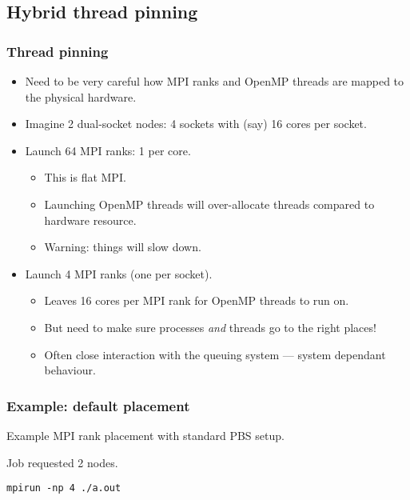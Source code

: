 \documentclass{beamer}
\begin{document}
\subsection{Hybrid thread pinning}
\begin{frame}
\frametitle{Thread pinning}
\begin{itemize}
  \item Need to be very careful how MPI ranks and OpenMP threads are mapped to the physical hardware.
  \item Imagine 2 dual-socket nodes: 4 sockets with (say) 16 cores per socket.
  \item Launch 64 MPI ranks: 1 per core.
    \begin{itemize}
      \item This is flat MPI.
      \item Launching OpenMP threads will over-allocate threads compared to hardware resource.
      \item Warning: things will slow down.
    \end{itemize}
  \item Launch 4 MPI ranks (one per socket).
    \begin{itemize}
      \item Leaves 16 cores per MPI rank for OpenMP threads to run on.
      \item But need to make sure processes \emph{and} threads go to the right places!
      \item Often close interaction with the queuing system --- system dependant behaviour.
    \end{itemize}
\end{itemize}
\end{frame}

\begin{frame}[fragile]
\frametitle{Example: default placement}
Example MPI rank placement with standard PBS setup.

Job requested 2 nodes.

\begin{verbatim}
mpirun -np 4 ./a.out
\end{verbatim}

\begin{center}
\begin{adjustbox}{max width={\textwidth}}
\end{adjustbox}
\end{center}
\end{frame}
\end{document}
